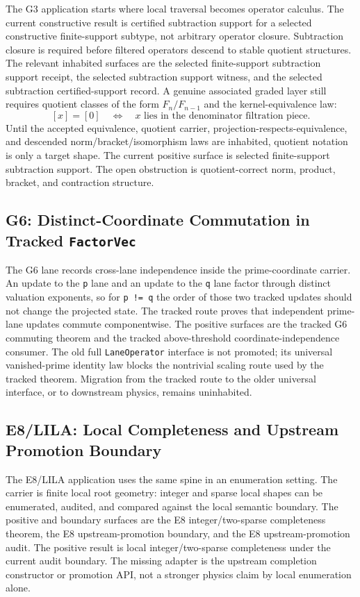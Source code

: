 \documentclass[11pt]{article}
\theoremstyle{definition}
\theoremstyle{plain}
\theoremstyle{remark}
\begin{document}
The G3 application starts where local traversal becomes operator calculus. The
current constructive result is certified subtraction support for a selected
constructive finite-support subtype, not arbitrary operator closure. Subtraction
closure is required before filtered operators descend to stable quotient
structures. The relevant inhabited surfaces are the selected finite-support
subtraction support receipt, the selected subtraction support witness, and the
selected subtraction certified-support record. A genuine associated graded layer still
requires quotient classes of the form \(F_n/F_{n-1}\) and the kernel-equivalence
law:
\[
  [x] = [0] \quad \Longleftrightarrow \quad
  x \textrm{ lies in the denominator filtration piece.}
\]
Until the accepted equivalence, quotient carrier,
projection-respects-equivalence, and descended norm/bracket/isomorphism laws
are inhabited, quotient notation is only a target shape. The current positive
surface is selected finite-support subtraction support. The open obstruction is
quotient-correct norm, product, bracket, and contraction structure.

\subsection{G6: Distinct-Coordinate Commutation in Tracked \texttt{FactorVec}}

The G6 lane records cross-lane independence inside the prime-coordinate
carrier. An update to the \texttt{p} lane and an update to the \texttt{q} lane
factor through distinct valuation exponents, so for \texttt{p != q} the order
of those two tracked updates should not change the projected state. The tracked
route proves that independent prime-lane updates commute componentwise. The
positive surfaces are the tracked G6 commuting theorem and the tracked above-threshold
coordinate-independence consumer. The old full \texttt{LaneOperator} interface
is not promoted; its universal
vanished-prime identity law blocks the nontrivial scaling route used by the
tracked theorem. Migration from the tracked route to the older universal
interface, or to downstream physics, remains uninhabited.

\subsection{E8/LILA: Local Completeness and Upstream Promotion Boundary}

The E8/LILA application uses the same spine in an enumeration setting. The
carrier is finite local root geometry: integer and sparse local shapes can be
enumerated, audited, and compared against the local semantic boundary. The
positive and boundary surfaces are the E8 integer/two-sparse completeness
theorem, the E8 upstream-promotion boundary, and the E8 upstream-promotion
audit. The positive result is local integer/two-sparse completeness under the
current audit boundary. The missing adapter is the upstream completion
constructor or promotion API, not a stronger physics claim by local enumeration
alone.
\end{document}
